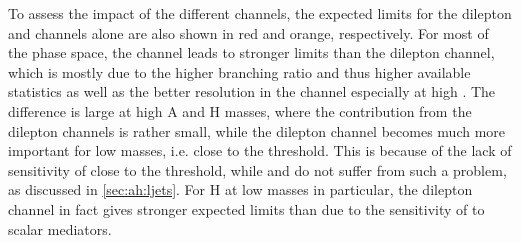 To assess the impact of the different channels, the expected limits for the dilepton and \ljets channels alone are also shown in red and orange, respectively. For most of the phase space, the \ljets channel leads to stronger limits than the dilepton channel, which is mostly due to the higher branching ratio and thus higher available statistics as well as the better \mtt resolution in the \ljets channel especially at high \mtt. The difference is large at high A and H masses, where the contribution from the dilepton channels is rather small, while the dilepton channel becomes much more important for low masses, i.e. close to the \ttbar threshold. This is because of the lack of sensitivity of \abscostl close to the \ttbar threshold, while \chel and \chan do not suffer from such a problem, as discussed in \cref{sec:ah:ljets}. For H at low masses in particular, the dilepton channel in fact gives stronger expected limits than \ljets due to the sensitivity of \chan to scalar mediators.

